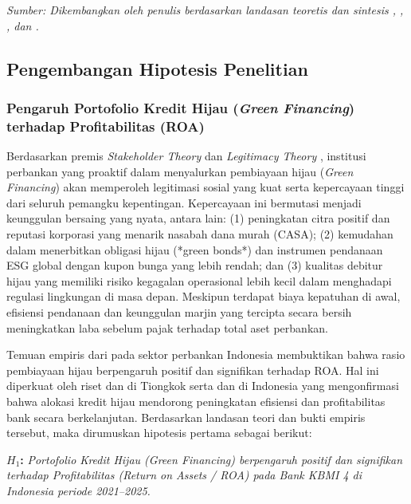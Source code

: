 \documentclass[12pt,a4paper]{article}
\numberwithin{equation}{section}
\begin{document}
\noindent \textit{Sumber: Dikembangkan oleh penulis berdasarkan landasan teoretis dan sintesis \citet{Pramono2022}, \citet{Yin2021}, \citet{KuncoroSuhardjono2018}, dan \citet{BrighamEhrhardt2020}.}

\subsection{Pengembangan Hipotesis Penelitian}

\subsubsection{Pengaruh Portofolio Kredit Hijau (\emph{Green Financing}) terhadap Profitabilitas (ROA)}
\noindent
Berdasarkan premis \emph{Stakeholder Theory} \citep{Freeman2010} dan \emph{Legitimacy Theory} \citep{Suchman1995}, institusi perbankan yang proaktif dalam menyalurkan pembiayaan hijau (\emph{Green Financing}) akan memperoleh legitimasi sosial yang kuat serta kepercayaan tinggi dari seluruh pemangku kepentingan. Kepercayaan ini bermutasi menjadi keunggulan bersaing yang nyata, antara lain: (1) peningkatan citra positif dan reputasi korporasi yang menarik nasabah dana murah (CASA); (2) kemudahan dalam menerbitkan obligasi hijau (*green bonds*) dan instrumen pendanaan ESG global dengan kupon bunga yang lebih rendah; dan (3) kualitas debitur hijau yang memiliki risiko kegagalan operasional lebih kecil dalam menghadapi regulasi lingkungan di masa depan. Meskipun terdapat biaya kepatuhan di awal, efisiensi pendanaan dan keunggulan marjin yang tercipta secara bersih meningkatkan laba sebelum pajak terhadap total aset perbankan.

\noindent
Temuan empiris dari \citet{Pramono2022} pada sektor perbankan Indonesia membuktikan bahwa rasio pembiayaan hijau berpengaruh positif dan signifikan terhadap ROA. Hal ini diperkuat oleh riset \citet{Yin2021} dan \citet{Sun2021} di Tiongkok serta \citet{SariAstuti2023} dan \citet{WulandariRahardjo2022} di Indonesia yang mengonfirmasi bahwa alokasi kredit hijau mendorong peningkatan efisiensi dan profitabilitas bank secara berkelanjutan. Berdasarkan landasan teori dan bukti empiris tersebut, maka dirumuskan hipotesis pertama sebagai berikut:

\vspace{0.2cm}
\noindent \textbf{$H_1$:} \emph{Portofolio Kredit Hijau (Green Financing) berpengaruh positif dan signifikan terhadap Profitabilitas (Return on Assets / ROA) pada Bank KBMI 4 di Indonesia periode 2021--2025.}
\end{document}

